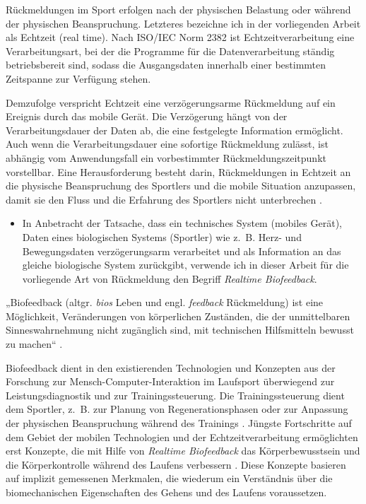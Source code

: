 Rückmeldungen im Sport erfolgen nach der physischen Belastung oder während der physischen Beanspruchung. Letzteres bezeichne ich in der vorliegenden Arbeit als Echtzeit (real time). Nach ISO/IEC Norm 2382 ist Echtzeitverarbeitung eine Verarbeitungsart, bei der die Programme für die Datenverarbeitung ständig betriebsbereit sind, sodass die Ausgangsdaten innerhalb einer bestimmten Zeitspanne zur Verfügung stehen.

Demzufolge verspricht Echtzeit eine verzögerungsarme Rückmeldung auf ein Ereignis durch das mobile Gerät. Die Verzögerung hängt von der Verarbeitungsdauer der Daten ab, die eine festgelegte Information ermöglicht. Auch wenn die Verarbeitungsdauer eine sofortige Rückmeldung zulässt, ist abhängig vom Anwendungsfall ein vorbestimmter Rückmeldungszeitpunkt vorstellbar. Eine Herausforderung besteht darin, Rückmeldungen in Echtzeit an die physische Beanspruchung des Sportlers und die mobile Situation anzupassen, damit sie den Fluss und die Erfahrung des Sportlers nicht unterbrechen \citep[][]{Nylander2014}.
\begin{itemize}
	
	\item In Anbetracht der Tatsache, dass ein technisches System (mobiles Gerät), Daten eines biologischen Systems (Sportler) wie z.~B. Herz- und Bewegungsdaten verzögerungsarm verarbeitet und als Information an das gleiche biologische System zurückgibt, verwende ich in dieser Arbeit für die vorliegende Art von Rückmeldung den Begriff \emph{Realtime Biofeedback}.
\end{itemize}

„Biofeedback (altgr. \emph{bios} Leben und engl. \emph{feedback} Rückmeldung) ist eine Möglichkeit, Veränderungen von körperlichen Zuständen, die der unmittelbaren Sinneswahrnehmung nicht zugänglich sind, mit technischen Hilfsmitteln bewusst zu machen“ \citep[][S.~483]{Riemer2015}.

Biofeedback dient in den existierenden Technologien und Konzepten aus der Forschung zur Mensch-Computer-Interaktion im Laufsport überwiegend zur Leistungsdiagnostik und zur Trainingssteuerung. Die Trainingssteuerung dient dem Sportler, z.~B. zur Planung von Regenerationsphasen oder zur Anpassung der physischen Beanspruchung während des Trainings \citep[][S.~81-107]{Marquardt2011}. Jüngste Fortschritte auf dem Gebiet der mobilen Technologien und der Echtzeitverarbeitung ermöglichten erst Konzepte, die mit Hilfe von \emph{Realtime Biofeedback} das Körperbewusstsein und die Körperkontrolle während des Laufens verbessern \citep[][]{Strohrmann2013, Strohrmann2013a, Strohrmann2014}. Diese Konzepte basieren auf implizit gemessenen Merkmalen, die wiederum ein Verständnis über die biomechanischen Eigenschaften des Gehens und des Laufens voraussetzen. 

